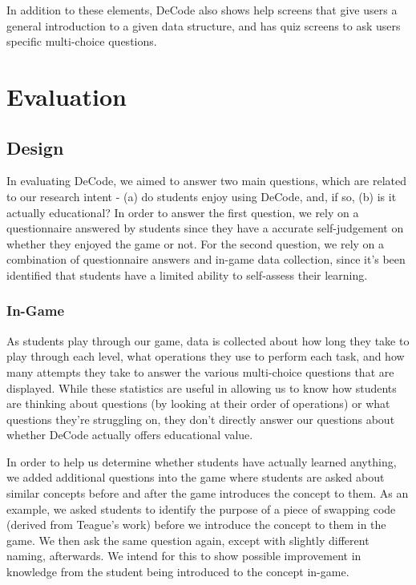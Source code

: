 \documentclass[11pt]{article}
\begin{document}
In addition to these elements, DeCode also shows help screens that give users a general introduction to a given data structure, and has quiz screens to ask users specific multi-choice questions.
\section{Evaluation}
\subsection{Design}
In evaluating DeCode, we aimed to answer two main questions, which are related to our research intent - (a) do students enjoy using DeCode, and, if so, (b) is it actually educational? In order to answer the first question, we rely on a questionnaire answered by students since they have a accurate self-judgement on whether they enjoyed the game or not. For the second question, we rely on a combination of questionnaire answers and in-game data collection, since it's been identified that students have a limited ability to self-assess their learning\cite{Battistella}.
\subsubsection{In-Game}
As students play through our game, data is collected about how long they take to play through each level, what operations they use to perform each task, and how many attempts they take to answer the various multi-choice questions that are displayed. While these statistics are useful in allowing us to know how students are thinking about questions (by looking at their order of operations) or what questions they're struggling on, they don't directly answer our questions about whether DeCode actually offers educational value.\par
In order to help us determine whether students have actually learned anything, we added additional questions into the game where students are asked about similar concepts before and after the game introduces the concept to them. As an example, we asked students to identify the purpose of a piece of swapping code (derived from Teague's work\cite{Teague:2012:SHW:2483716.2483727}) before we introduce the concept to them in the game. We then ask the same question again, except with slightly different naming, afterwards. We intend for this to show possible improvement in knowledge from the student being introduced to the concept in-game.
\end{document}
